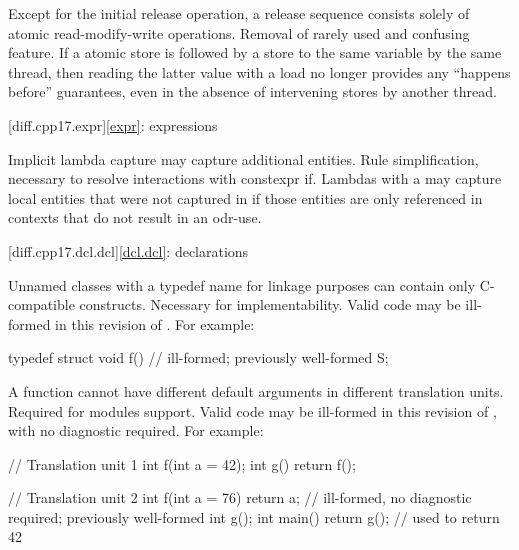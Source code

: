 \change
Except for the initial release operation,
a release sequence consists solely of atomic read-modify-write operations.
\rationale
Removal of rarely used and confusing feature.
\effect
If a  atomic store is followed
by a  store to the same variable by the same thread,
then reading the latter value with a  load
no longer provides any ``happens before'' guarantees,
even in the absence of intervening stores by another thread.

[diff.cpp17.expr]{\ref{expr}: expressions}

\change
Implicit lambda capture may capture additional entities.
\rationale
Rule simplification, necessary to resolve interactions with constexpr if.
\effect
Lambdas with a 
may capture local entities
that were not captured in \CppXVII{}
if those entities are only referenced in contexts
that do not result in an odr-use.

[diff.cpp17.dcl.dcl]{\ref{dcl.dcl}: declarations}

\change
Unnamed classes with a typedef name for linkage purposes
can contain only C-compatible constructs.
\rationale
Necessary for implementability.
\effect
Valid \CppXVII{} code may be ill-formed in this revision of \Cpp{}.
For example:
\begin{codeblock}
typedef struct {
  void f() {}           // ill-formed; previously well-formed
} S;
\end{codeblock}

\change
A function cannot have different default arguments
in different translation units.
\rationale
Required for modules support.
\effect
Valid \CppXVII{} code may be ill-formed in this revision of \Cpp{},
with no diagnostic required.
For example:
\begin{codeblock}
// Translation unit 1
int f(int a = 42);
int g() { return f(); }

// Translation unit 2
int f(int a = 76) { return a; }         // ill-formed, no diagnostic required; previously well-formed
int g();
int main() { return g(); }              // used to return 42
\end{codeblock}

